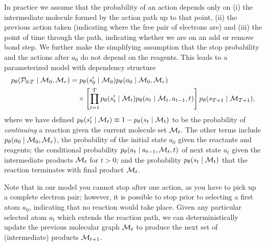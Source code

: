 In practice we assume that the probability of an action depends only on (i) the intermediate molecule formed by the action path up to that point, (ii) the previous action taken (indicating where the free pair of electrons are) and (iii) the point of time through the path, indicating whether we are on an add or remove bond step. 
We further make the simplifying assumption that the stop probability and the actions after $a_0$ do not depend on the reagents. This leads to a parameterized model with dependency structure
\begin{align}
\label{eq:jointprob}
p_\theta({\mathcal{P}}_{0:T} \mid {\mathcal{M}}_0, {\mathcal{M}}_r) 
&=
	p_\theta(s'_0 \mid {\mathcal{M}}_0)
	p_\theta(a_0 \mid {\mathcal{M}}_0, {\mathcal{M}}_r)\\ \nonumber &\quad \times
	\left[\prod_{t=1}^{T}
		p_\theta(s_{t}' \mid {\mathcal{M}}_{t})
		p_\theta(a_t \mid {\mathcal{M}}_{t}, a_{t-1}, t)
	\right]
	p_\theta(s_{T+1} \mid {\mathcal{M}}_{T+1})
	,
\end{align}
where we have defined $p_\theta(s'_t \mid {\mathcal{M}}_t) \equiv 1 - p_\theta(s_t \mid {\mathcal{M}}_t)$ to be the probability of {\em continuing} a reaction given the current molecule set ${\mathcal{M}}_t$.
The other terms include $p_\theta(a_0 \mid {\mathcal{M}}_0, {\mathcal{M}}_r)$, the probability of the initial state $a_0$ given the reactants and reagents; 
the conditional probability $p_\theta(a_t \mid a_{t-1}, {\mathcal{M}}_t, t)$ 
of next state $a_t$ given the intermediate products ${\mathcal{M}}_t$ for $t > 0$;
and the probability $p_\theta(s_t \mid {\mathcal{M}}_t)$ that the reaction terminates with final product ${\mathcal{M}}_{t}$.

%
%
%
Note that in our model you cannot stop after one action, as you have to pick up a complete electron pair;
however, it is possible to stop prior to selecting a first atom $a_0$, indicating that no reaction would take place.
Given any particular selected atom $a_t$ which extends the reaction path, we can deterministically update the previous molecular graph ${\mathcal{M}}_{t}$ to produce the next set of (intermediate) products ${\mathcal{M}}_{t+1}$.

